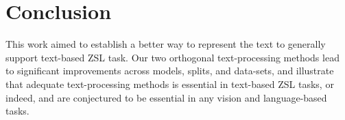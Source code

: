 \documentclass[11pt,a4paper]{article}
\newcommand\reut[1]{\textcolor{green}{\textbf{REUT:} #1 }}
\begin{document}


\par



\section{Conclusion}
\label{conclusion}

This work aimed to establish a better way to represent the text to generally support text-based ZSL task. Our two orthogonal text-processing methods lead to significant improvements across models, splits, and data-sets, and illustrate that adequate text-processing methods is essential  in text-based ZSL tasks, or indeed, and are conjectured to be essential in any vision and language-based tasks. 




\end{document}
